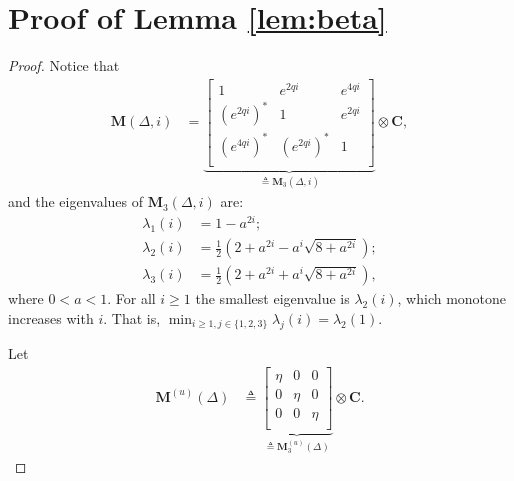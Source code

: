 \documentclass[conference, a4paper, 10pt]{IEEEtran}
\newcommand{\mx}[1]{\mathbf{#1}}
\begin{document}
\appendices
\section{Proof of Lemma \ref{lem:beta}}
\label{Sec:L4}
\begin{proof} %
Notice that
\begin{align}
\label{eq:MDelta}
\mx{M}(\Delta,i) &=
\underbrace{\begin{bmatrix}
1 & e^{2qi} & e^{4qi}  \\
{(e^{2qi})}^* & 1 & e^{2qi} \\
{(e^{4qi})}^* &  {(e^{2qi})}^* & 1\\
\end{bmatrix}}_{\triangleq \mx{M}_3(\Delta,i)}
 \otimes \mx{C},
\end{align}
%
and the eigenvalues of $\mx{M}_3(\Delta,i)$ are:
\begin{align*}
\lambda_1(i) &= 1 - a^{2i}; \\
\lambda_2(i) &= \frac{1}{2}\left(2+a^{2i}-a^i\sqrt{8+a^{2i}}\right);\\
\lambda_3(i) &= \frac{1}{2}\left(2+a^{2i}+a^i\sqrt{8+a^{2i}}\right),
\end{align*}
where $0<a<1$.
For all $i\geq1$ the smallest eigenvalue is $\lambda_2(i)$, which monotone increases with $i$. That is, $\min_{i\geq 1,j\in\{1,2,3\}} \lambda_j(i) = \lambda_2(1)$.

Let
\begin{align}
\mx{M}^{(u)}(\Delta) &\triangleq
\underbrace{\begin{bmatrix}
\eta & 0 & 0  \\
0 & \eta & 0  \\
0 &  0 & \eta \\
\end{bmatrix}}_{\triangleq \mx{M}^{(u)}_3(\Delta)}
 \otimes \mx{C}.
\end{align}


\end{proof}
\end{document}
